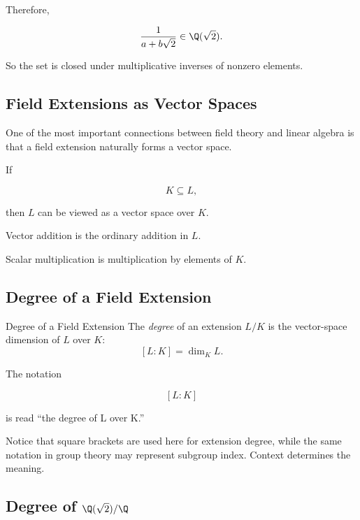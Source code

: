 Therefore,

\[ \frac{1}{a+b\sqrt2}\in\Q(\sqrt2). \]

So the set is closed under multiplicative inverses of nonzero elements.

\subsection{Field Extensions as Vector Spaces}
\label{subsec:extensions-vector-spaces}

One of the most important connections between field theory and linear algebra
is that a field extension naturally forms a vector space.

If

\[ K\subseteq L, \]

then \(L\) can be viewed as a vector space over \(K\).

Vector addition is the ordinary addition in \(L\).

Scalar multiplication is multiplication by elements of \(K\).

\subsection{Degree of a Field Extension}
\label{subsec:degree-field-extension}

\begin{definitionbox}{Degree of a Field Extension}
The \emph{degree} of an extension \(L/K\) is the vector-space dimension of
\(L\) over \(K\):
\[ [L:K]=\dim_K L. \]
\end{definitionbox}

The notation

\[ [L:K] \]

is read ``the degree of L over K.''

Notice that square brackets are used here for extension degree, while the same
notation in group theory may represent subgroup index. Context determines the
meaning.

\subsection{Degree of \(\Q(\sqrt2)/\Q\)}
\label{subsec:degree-q-sqrt2}

